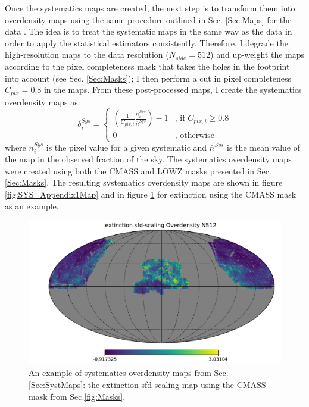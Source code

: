 \qquad Once the \healpix systematics maps are created, the next step is to transform them into overdensity maps using the same procedure outlined in Sec. \ref{Sec:Maps} for the data \citep{Boris2013}. The idea is to treat the systematic maps in the same way as the data in order to apply the statistical estimators consistently. Therefore, I degrade the high-resolution maps to the data resolution ($N_{side} = 512$) and up-weight the maps according to the pixel completeness mask that takes the holes in the footprint into account (see Sec. \ref{Sec:Masks}); I then perform a cut in pixel completeness $C_{pix} = 0.8$ in the maps. From these post-processed maps, I create the systematics overdensity maps as: 
\begin{equation}
\delta_{i}^{Sys} = 
\begin{cases}
\left(\frac{1}{C_{pix,i}}\frac{n^{Sys}_{i}}{\bar{n}^{Sys}}\right) - 1 & \text{, if } C_{pix,i} \geq 0.8 \\
0 & \text{, otherwise}
\end{cases}
\label{Eq:OverDMapsSyst}
\end{equation}
where $n^{Sys}_{i}$ is the pixel value for a given systematic and $\bar{n}^{Sys}$ is the mean value of the map in the observed fraction of the sky. The systematics overdensity maps were created using both the CMASS and LOWZ masks presented in Sec. \ref{Sec:Masks}. The resulting systematics overdensity maps are shown in figure \ref{fig:SYS_Appendix1Map} and in figure \ref{fig:ExtincSys} for extinction using the CMASS mask as an example.

\begin{figure}
\begin{center}
\includegraphics[width=\textwidth]{BOSS-FIGS/map_extinction_sfd-scaling_Overdensity_N512_cmassAll.pdf}
\caption[Extinction SDF scaling overdensity systematic map.]{An example of systematics overdensity maps from Sec. \ref{Sec:SystMaps}: the extinction sfd scaling map \citep{Schlegel1998} using the CMASS mask from Sec.\ref{fig:Masks}. }
\label{fig:ExtincSys}
\end{center}
\end{figure}

